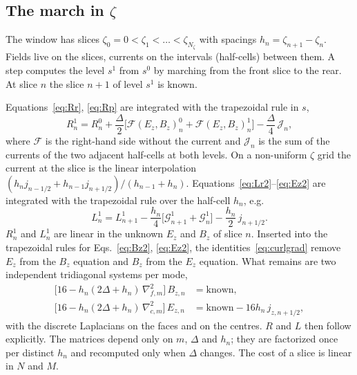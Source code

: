 \documentclass[aps,prab,reprint,floatfix,superscriptaddress,amsmath,amssymb]{revtex4-2}
\begin{document}
\subsection{The march in $\zeta$}\label{sec:march}

The window has slices $\zeta_0 = 0 < \zeta_1 < \dots < \zeta_{N_\zeta}$ with spacings $h_n = \zeta_{n+1} - \zeta_n$. Fields live on the slices, currents on the intervals (half-cells) between them. A step computes the level $s^1$ from $s^0$ by marching from the front slice to the rear. At slice $n$ the slice $n+1$ of level $s^1$ is known.

Equations~\eqref{eq:Rr}, \eqref{eq:Rp} are integrated with the trapezoidal rule in $s$,
\begin{equation}
R^1_n = R^0_n + \frac{\Delta}{2}\bigl[\mathcal F(E_z, B_z)^0_n + \mathcal F(E_z, B_z)^1_n\bigr] - \frac{\Delta}{4}\,\mathcal J_n, \label{eq:Rdisc}
\end{equation}
where $\mathcal F$ is the right-hand side without the current and $\mathcal J_n$ is the sum of the currents of the two adjacent half-cells at both levels. On a non-uniform $\zeta$ grid the current at the slice is the linear interpolation $(h_n j_{n-1/2} + h_{n-1} j_{n+1/2})/(h_{n-1} + h_n)$. Equations~\eqref{eq:Lr2}--\eqref{eq:Ez2} are integrated with the trapezoidal rule over the half-cell $h_n$, e.g.
\begin{equation}
L^1_n = L^1_{n+1} - \frac{h_n}{4}\bigl[\mathcal G^1_{n+1} + \mathcal G^1_n\bigr] - \frac{h_n}{2}\, j_{n+1/2}. \label{eq:Ldisc}
\end{equation}
$R^1_n$ and $L^1_n$ are linear in the unknown $E_z$ and $B_z$ of slice $n$. Inserted into the trapezoidal rules for Eqs.~\eqref{eq:Bz2}, \eqref{eq:Ez2}, the identities~\eqref{eq:curlgrad} remove $E_z$ from the $B_z$ equation and $B_z$ from the $E_z$ equation. What remains are two independent tridiagonal systems per mode,
\begin{align}
\bigl[16 - h_n(2\Delta + h_n)\,\nabla^2_{f,m}\bigr]\, B_{z,n} &= \text{known}, \\
\bigl[16 - h_n(2\Delta + h_n)\,\nabla^2_{c,m}\bigr]\, E_{z,n} &= \text{known} - 16 h_n\, j_{z,n+1/2},
\end{align}
with the discrete Laplacians on the faces and on the centres. $R$ and $L$ then follow explicitly. The matrices depend only on $m$, $\Delta$ and $h_n$; they are factorized once per distinct $h_n$ and recomputed only when $\Delta$ changes. The cost of a slice is linear in $N$ and $M$.
\end{document}
